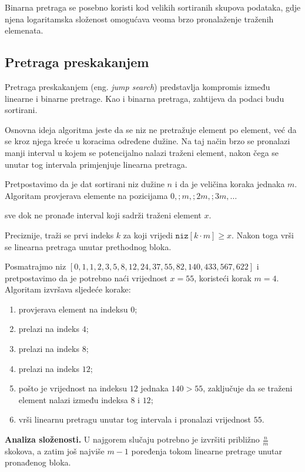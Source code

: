 Binarna pretraga se posebno koristi kod velikih sortiranih skupova podataka, gdje njena logaritamska složenost omogućava veoma brzo pronalaženje traženih elemenata.

\subsection{Pretraga preskakanjem}

Pretraga preskakanjem (eng. \emph{jump search}) predstavlja kompromis između linearne i binarne pretrage. Kao i binarna pretraga, zahtijeva da podaci budu sortirani.

Osnovna ideja algoritma jeste da se niz ne pretražuje element po element, već da se kroz njega kreće u koracima određene dužine. Na taj način brzo se pronalazi manji interval u kojem se potencijalno nalazi traženi element, nakon čega se unutar tog intervala primjenjuje linearna pretraga.

Pretpostavimo da je dat sortirani niz dužine $n$ i da je veličina koraka jednaka $m$. Algoritam provjerava elemente na pozicijama $0,; m,; 2m,; 3m,\ldots$

sve dok ne pronađe interval koji sadrži traženi element $x$.

Preciznije, traži se prvi indeks $k$ za koji vrijedi $\texttt{niz}[k \cdot m] \geq x.$ Nakon toga vrši se linearna pretraga unutar prethodnog bloka.

Posmatrajmo niz $
[0,1,1,2,3,5,8,12,24,37,55,82,140,433,567,622]$ i pretpostavimo da je potrebno naći vrijednost $x=55$, koristeći korak $m=4.$ Algoritam izvršava sljedeće korake:

\begin{enumerate}
	\item provjerava element na indeksu $0$;
	\item prelazi na indeks $4$;
	\item prelazi na indeks $8$;
	\item prelazi na indeks $12$;
	\item pošto je vrijednost na indeksu $12$ jednaka $140 > 55$, zaključuje da se traženi element nalazi između indeksa $8$ i $12$;
	\item vrši linearnu pretragu unutar tog intervala i pronalazi vrijednost $55$.
\end{enumerate}

\textbf{Analiza složenosti.} U najgorem slučaju potrebno je izvršiti približno $\frac{n}{m}$ skokova, a zatim još najviše $m-1$ poređenja tokom linearne pretrage unutar pronađenog bloka.


